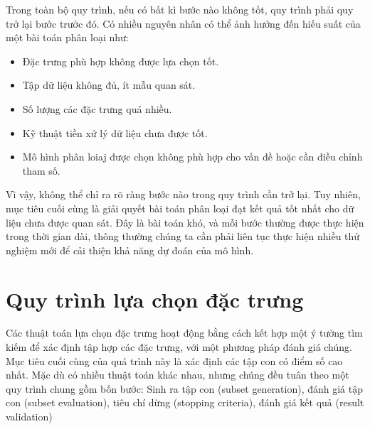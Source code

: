 Trong toàn bộ quy trình, nếu có bất kì bước nào không tốt, quy trình phải quy trở lại bước trước đó. Có nhiều nguyên nhân có thể ảnh hưởng đến hiếu suất của một bài toán phân loại \cite{kotsiantis2007supervised} như:
\begin{itemize}
	\item Đặc trưng phù hợp không được lựa chọn tốt.
	\item Tập dữ liệu không đủ, ít mẫu quan sát.
	\item Số lượng các đặc trưng quá nhiều.
	\item Kỹ thuật tiền xử lý dữ liệu chưa được tốt.
	\item Mô hình phân loiaj được chọn không phù hợp cho vấn đề hoặc cần điều chỉnh tham số.
\end{itemize}

Vì vậy, không thể chỉ ra rõ ràng bước nào trong quy trình cần trở lại. Tuy nhiên, mục tiêu cuối cùng là giải quyết bài toán phân loại đạt kết quả tốt nhất cho dữ liệu chưa được quan sát. Đây là bài toán khó, và mỗi bước thường được thực hiện trong thời gian dài, thông thường chúng ta cần phải liên tục thực hiện nhiều thử nghiệm mới để cải thiện khả năng dự đoán của mô hình.

\section{Quy trình lựa chọn đặc trưng}
Các thuật toán lựa chọn đặc trưng 
hoạt động bằng cách kết hợp một ý tưởng tìm kiếm để xác định tập hợp các đặc trưng, với một phương pháp đánh giá chúng. Mục tiêu cuối cùng của quá trình này là xác định các tập con có điểm số cao nhất. Mặc dù có nhiều thuật toán khác nhau, nhưng chúng đều tuân theo một quy trình chung gồm bốn bước: Sinh ra tập con (subset generation), đánh giá tập con (subset evaluation), tiêu chí dừng (stopping criteria), đánh giá kết quả (result validation) \cite{molina2002feature, liu2005toward, kumar2014feature}

